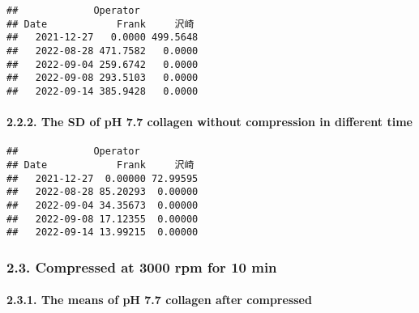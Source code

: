\documentclass[
]{article}
\newenvironment{Shaded}{\begin{snugshade}}{\end{snugshade}}
\newcommand{\AttributeTok}[1]{\textcolor[rgb]{0.77,0.63,0.00}{#1}}
\newcommand{\FunctionTok}[1]{\textcolor[rgb]{0.00,0.00,0.00}{#1}}
\newcommand{\NormalTok}[1]{#1}
\newcommand{\SpecialCharTok}[1]{\textcolor[rgb]{0.00,0.00,0.00}{#1}}
\newcommand{\StringTok}[1]{\textcolor[rgb]{0.31,0.60,0.02}{#1}}
\begin{document}
\begin{verbatim}
##             Operator
## Date            Frank     沢崎
##   2021-12-27   0.0000 499.5648
##   2022-08-28 471.7582   0.0000
##   2022-09-04 259.6742   0.0000
##   2022-09-08 293.5103   0.0000
##   2022-09-14 385.9428   0.0000
\end{verbatim}

\hypertarget{the-sd-of-ph-7.7-collagen-without-compression-in-different-time}{%
\paragraph{2.2.2. The SD of pH 7.7 collagen without compression in
different
time}\label{the-sd-of-ph-7.7-collagen-without-compression-in-different-time}}

\begin{Shaded}
\end{Shaded}

\begin{verbatim}
##             Operator
## Date            Frank     沢崎
##   2021-12-27  0.00000 72.99595
##   2022-08-28 85.20293  0.00000
##   2022-09-04 34.35673  0.00000
##   2022-09-08 17.12355  0.00000
##   2022-09-14 13.99215  0.00000
\end{verbatim}

\hypertarget{compressed-at-3000-rpm-for-10-min}{%
\subsubsection{2.3. Compressed at 3000 rpm for 10
min}\label{compressed-at-3000-rpm-for-10-min}}

\hypertarget{the-means-of-ph-7.7-collagen-after-compressed}{%
\paragraph{2.3.1. The means of pH 7.7 collagen after
compressed}\label{the-means-of-ph-7.7-collagen-after-compressed}}
\end{document}

